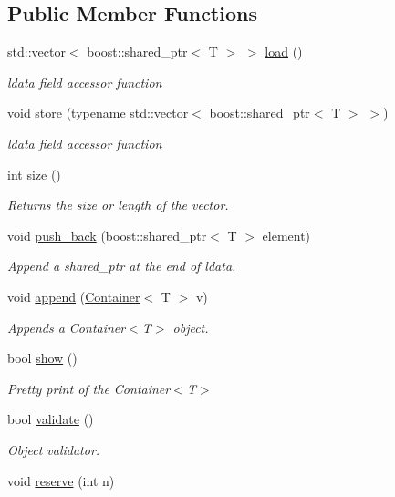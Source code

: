 \subsection*{Public Member Functions}
\begin{DoxyCompactItemize}
\item 
std::vector$<$ boost::shared\_\-ptr$<$ T $>$ $>$ \hyperlink{classvec_a_m_o_r_e_aeabf8a479f9031cc8ef9af0a971a08ea}{load} ()
\begin{DoxyCompactList}\small\item\em ldata field accessor function \end{DoxyCompactList}\item 
void \hyperlink{classvec_a_m_o_r_e_ad1594c084d534c3de7acedd714f2e12a}{store} (typename std::vector$<$ boost::shared\_\-ptr$<$ T $>$ $>$)
\begin{DoxyCompactList}\small\item\em ldata field accessor function \end{DoxyCompactList}\item 
int \hyperlink{classvec_a_m_o_r_e_ae1289a7870dbdd19b6455a890e94ce48}{size} ()
\begin{DoxyCompactList}\small\item\em Returns the size or length of the vector. \end{DoxyCompactList}\item 
void \hyperlink{classvec_a_m_o_r_e_a7b02ec757039b4d8fa98c3682002f156}{push\_\-back} (boost::shared\_\-ptr$<$ T $>$ element)
\begin{DoxyCompactList}\small\item\em Append a shared\_\-ptr at the end of ldata. \end{DoxyCompactList}\item 
void \hyperlink{classvec_a_m_o_r_e_ab060ffa67e85997fc4236bedfd2f17b6}{append} (\hyperlink{classvec_a_m_o_r_e}{Container}$<$ T $>$ v)
\begin{DoxyCompactList}\small\item\em Appends a Container$<$T$>$ object. \end{DoxyCompactList}\item 
bool \hyperlink{classvec_a_m_o_r_e_a11b0ffb0d2481f1960cb49a26b227d37}{show} ()
\begin{DoxyCompactList}\small\item\em Pretty print of the Container$<$T$>$ \end{DoxyCompactList}\item 
bool \hyperlink{classvec_a_m_o_r_e_a247aaafe9115cc433fc3be297c1f568e}{validate} ()
\begin{DoxyCompactList}\small\item\em Object validator. \end{DoxyCompactList}\item 
void \hyperlink{classvec_a_m_o_r_e_ad8b51e17ac5ba203cb3d0221b4f7de2f}{reserve} (int n)
\end{DoxyCompactItemize}
